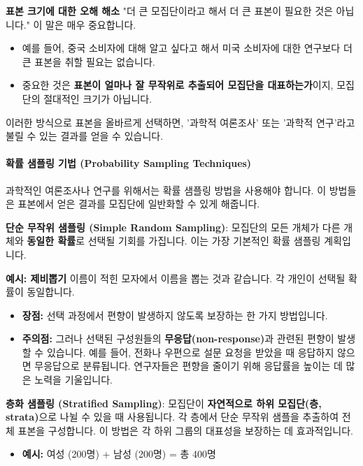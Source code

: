 \documentclass[11pt,a4paper]{book}
\newcommand{\concept}[1]{\textbf{#1}}
\theoremstyle{definition}
\begin{document}
\begin{examplebox}
\textbf{표본 크기에 대한 오해 해소}
"더 큰 모집단이라고 해서 더 큰 표본이 필요한 것은 아닙니다." 이 말은 매우 중요합니다.
\begin{itemize}
    \item 예를 들어, 중국 소비자에 대해 알고 싶다고 해서 미국 소비자에 대한 연구보다 더 큰 표본을 취할 필요는 없습니다.
    \item 중요한 것은 \textbf{표본이 얼마나 잘 무작위로 추출되어 모집단을 대표하는가}이지, 모집단의 절대적인 크기가 아닙니다.
\end{itemize}
이러한 방식으로 표본을 올바르게 선택하면, '과학적 여론조사' 또는 '과학적 연구'라고 불릴 수 있는 결과를 얻을 수 있습니다.
\end{examplebox}

\paragraph{확률 샘플링 기법 (Probability Sampling Techniques)}
과학적인 여론조사나 연구를 위해서는 확률 샘플링 방법을 사용해야 합니다. 이 방법들은 표본에서 얻은 결과를 모집단에 일반화할 수 있게 해줍니다.

\begin{tcolorbox}[infobox, title={확률 샘플링 기법 (1/3): 단순 무작위 샘플링 (Simple Random Sampling)}]
\concept{단순 무작위 샘플링 (Simple Random Sampling)}: 모집단의 모든 개체가 다른 개체와 \textbf{동일한 확률}로 선택될 기회를 가집니다. 이는 가장 기본적인 확률 샘플링 계획입니다.
\end{tcolorbox}

\begin{examplebox}
\textbf{예시: 제비뽑기}
이름이 적힌 모자에서 이름을 뽑는 것과 같습니다. 각 개인이 선택될 확률이 동일합니다.
\begin{itemize}
    \item \textbf{장점:} 선택 과정에서 편향이 발생하지 않도록 보장하는 한 가지 방법입니다.
    \item \textbf{주의점:} 그러나 선택된 구성원들의 \textbf{무응답(non-response)}과 관련된 편향이 발생할 수 있습니다. 예를 들어, 전화나 우편으로 설문 요청을 받았을 때 응답하지 않으면 무응답으로 분류됩니다. 연구자들은 편향을 줄이기 위해 응답률을 높이는 데 많은 노력을 기울입니다.
\end{itemize}
\end{examplebox}

\begin{tcolorbox}[infobox, title={확률 샘플링 기법 (2/3): 층화 샘플링 (Stratified Sampling)}]
\concept{층화 샘플링 (Stratified Sampling)}: 모집단이 \textbf{자연적으로 하위 모집단(층, strata)}으로 나뉠 수 있을 때 사용됩니다. 각 층에서 단순 무작위 샘플을 추출하여 전체 표본을 구성합니다. 이 방법은 각 하위 그룹의 대표성을 보장하는 데 효과적입니다.
\begin{itemize}
    \item \textbf{예시:} 여성 (200명) + 남성 (200명) = 총 400명
\end{itemize}
\end{tcolorbox}
\end{document}
